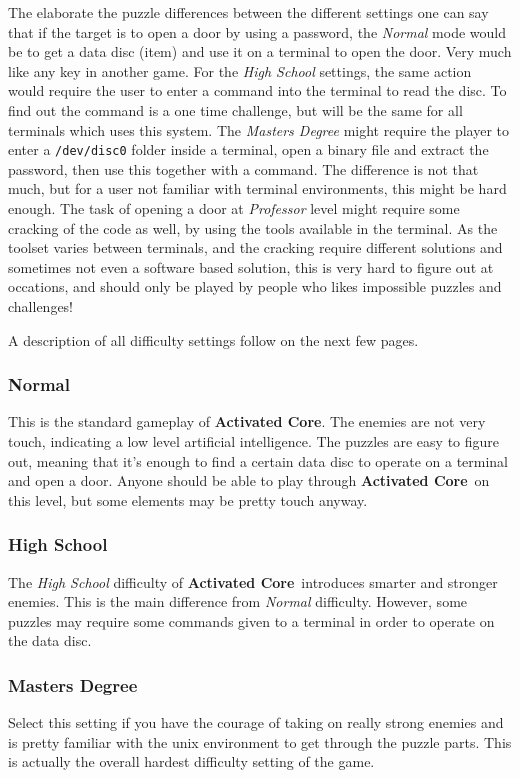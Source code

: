 \documentclass[a5paper, 10pt, titlepage, landscape, twoside, final]{article}
\newcommand{\ac}{\textbf{Activated Core}}
\begin{document}
The elaborate the puzzle differences between the different settings one can say that if the target is to open a door by using a password, the \textit{Normal} mode would be to get a data disc (item) and use it on a terminal to open the door. Very much like any key in another game. For the \textit{High School} settings, the same action would require the user to enter a command into the terminal to read the disc. To find out the command is a one time challenge, but will be the same for all terminals which uses this system. The \textit{Masters Degree} might require the player to enter a \texttt{/dev/disc0} folder inside a terminal, open a binary file and extract the password, then use this together with a command. The difference is not that much, but for a user not familiar with terminal environments, this might be hard enough. The task of opening a door at \textit{Professor} level might require some cracking of the code as well, by using the tools available in the terminal. As the toolset varies between terminals, and the cracking require different solutions and sometimes not even a software based solution, this is very hard to figure out at occations, and should only be played by people who likes impossible puzzles and challenges!

A description of all difficulty settings follow on the next few pages.

\clearpage
\subsubsection{Normal}
This is the standard gameplay of \ac. The enemies are not very touch, indicating a low level artificial intelligence. The puzzles are easy to figure out, meaning that it's enough to find a certain data disc to operate on a terminal and open a door. Anyone should be able to play through \ac\ on this level, but some elements may be pretty touch anyway.

\subsubsection{High School}
The \textit{High School} difficulty of \ac\ introduces smarter and stronger enemies. This is the main difference from \textit{Normal} difficulty. However, some puzzles may require some commands given to a terminal in order to operate on the data disc.

\subsubsection{Masters Degree}
Select this setting if you have the courage of taking on really strong enemies and is pretty familiar with the unix environment to get through the puzzle parts. This is actually the overall hardest difficulty setting of the game.
\end{document}
